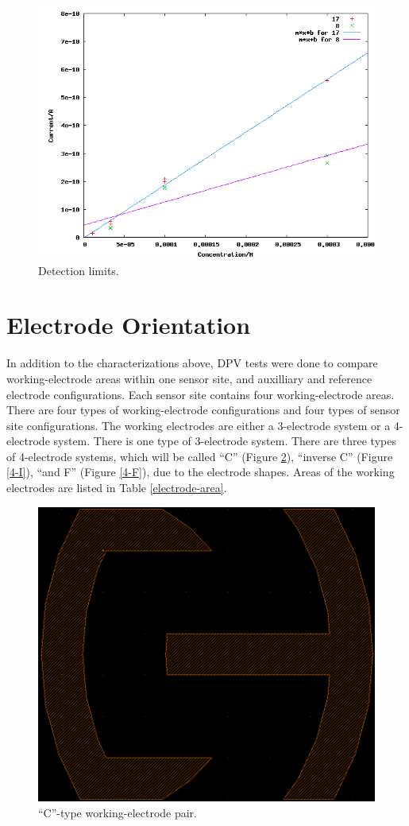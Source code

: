 \begin{figure}
	\centering
	\includegraphics[width=\linewidth]{figures/limit.png}
	\caption{Detection limits.}
	\label{limit figure}
\end{figure}

\section{Electrode Orientation}

In addition to the characterizations above, DPV tests were done to compare working-electrode areas within one sensor site, and auxilliary and reference electrode configurations. Each sensor site contains four working-electrode areas. There are four types of working-electrode configurations and four types of sensor site configurations. The working electrodes are either a 3-electrode system or a 4-electrode system. There is one type of 3-electrode system. There are three types of 4-electrode systems, which will be called ``C'' (Figure \ref{4-C}), ``inverse C'' (Figure \ref{4-I}), ``and F'' (Figure \ref{4-F}), due to the electrode shapes. Areas of the working electrodes are listed in Table \ref{electrode-area}.

\begin{figure}
	\centering
	\includegraphics[width=0.3\linewidth]{figures/4-C.png}
	\caption{``C''-type working-electrode pair.}
	\label{4-C}
\end{figure}

